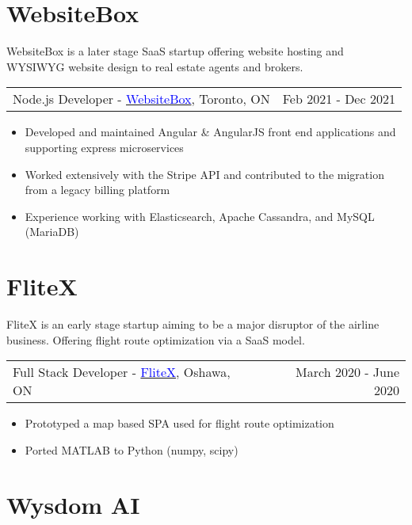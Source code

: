\documentclass[margin]{res}
\begin{document}
\begin{resume}
	\normalsize{\section{WebsiteBox}}

	WebsiteBox is a later stage SaaS startup offering website hosting and WYSIWYG
	website design to real estate agents and brokers.

	\begin{tabular}{p{3in} r} %
		Node.js Developer - \href{https://websitebox.com}{\textcolor{blue}{WebsiteBox}}, Toronto, ON & Feb 2021 - Dec 2021
	\end{tabular}

	\begin{itemize} %
		\item Developed and maintained Angular \& AngularJS front end applications and supporting
		      express microservices
		\item Worked extensively with the Stripe API and contributed to the migration from a legacy
		      billing platform
		\item Experience working with Elasticsearch, Apache Cassandra, and MySQL (MariaDB)
	\end{itemize}

	\normalsize{\section{FliteX}}

	FliteX is an early stage startup aiming to be a major disruptor of the airline business.
	Offering flight route optimization via a SaaS model.

	\begin{tabular}{p{3in} r} %
		Full Stack Developer - \href{https://flitex.net/}{\textcolor{blue}{FliteX}}, Oshawa, ON & March 2020 - June 2020
	\end{tabular}
	\begin{itemize} %
		\item Prototyped a map based SPA used for flight route optimization
		\item Ported MATLAB to Python (numpy, scipy)
	\end{itemize}

	\normalsize{\section{Wysdom AI}}


\end{resume}
\end{document}
